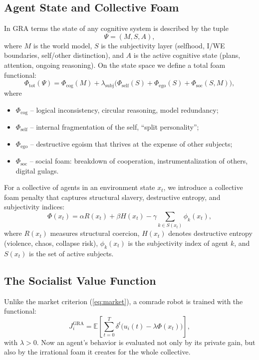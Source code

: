 \documentclass[a4paper,12pt]{article}
\begin{document}
\subsection{Agent State and Collective Foam}
In GRA terms the state of any cognitive system is described by the tuple
\begin{equation}\label{eq:psi}
\Psi = (M, S, A),
\end{equation}
where $M$ is the world model, $S$ is the subjectivity layer (selfhood, I/WE boundaries, self/other distinction), and $A$ is the active cognitive state (plans, attention, ongoing reasoning). On the state space we define a total foam functional:
\begin{equation}\label{eq:total_foam}
\Phi_{\text{tot}}(\Psi) = \Phi_{\text{cog}}(M) + \lambda_{\text{subj}}\bigl(\Phi_{\text{self}}(S) + \Phi_{\text{ego}}(S) + \Phi_{\text{soc}}(S, M)\bigr),
\end{equation}
where
\begin{itemize}
\item $\Phi_{\text{cog}}$ – logical inconsistency, circular reasoning, model redundancy;
\item $\Phi_{\text{self}}$ – internal fragmentation of the self, “split personality”;
\item $\Phi_{\text{ego}}$ – destructive egoism that thrives at the expense of other subjects;
\item $\Phi_{\text{soc}}$ – social foam: breakdown of cooperation, instrumentalization of others, digital gulags.
\end{itemize}

For a collective of agents in an environment state $x_t$, we introduce a collective foam penalty that captures structural slavery, destructive entropy, and subjectivity indices:
\begin{equation}\label{eq:collective_pena}
\Phi(x_t) = \alpha R(x_t) + \beta H(x_t) - \gamma \sum_{k \in S(x_t)} \phi_k(x_t),
\end{equation}
where $R(x_t)$ measures structural coercion, $H(x_t)$ denotes destructive entropy (violence, chaos, collapse risk), $\phi_k(x_t)$ is the subjectivity index of agent $k$, and $S(x_t)$ is the set of active subjects.

\subsection{The Socialist Value Function}
Unlike the market criterion (\ref{eq:market}), a comrade robot is trained with the functional:
\begin{equation}\label{eq:gra_objective}
J_i^{\text{GRA}} = \mathbb{E}\left[\sum_{t=0}^{T} \delta^t \bigl(u_i(t) - \lambda \Phi(x_t)\bigr)\right],
\end{equation}
with $\lambda > 0$. Now an agent’s behavior is evaluated not only by its private gain, but also by the irrational foam it creates for the whole collective.
\end{document}
